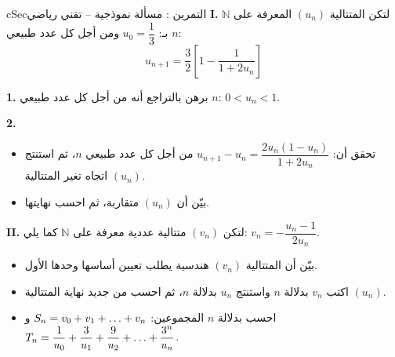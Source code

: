 \documentclass[12pt,a4paper]{article}
\newenvironment{BOX}[2]{\begin{otherlanguage}{english}\begin{arbox}{#1}{#2}}{\end{arbox}\end{otherlanguage}}
\newcounter{exo}
\newenvironment{tamrin}[1]{\stepcounter{exo}\begin{BOX}{cSec}{التمرين \theexo: #1}}{\end{BOX}}
\renewcommand{\dots}{\mathinner{\ldotp\ldotp\ldotp}}
\newcommand{\N}{\mathbb{N}}
\newenvironment{sq}{\begin{itemize}[leftmargin=2.4em,itemsep=3pt]}{\end{itemize}}
\newcommand{\qa}{\item[(أ)]}\newcommand{\qb}{\item[(ب)]}\newcommand{\qc}{\item[(جـ)]}\newcommand{\qd}{\item[(د)]}\newcommand{\qe}{\item[(هـ)]}
\newcommand{\QQ}[1]{\par\smallskip\textbf{#1.} }
\begin{document}
\begin{tamrin}{مسألة نموذجية -- تقني رياضي}
\textbf{I.} لتكن المتتالية $(u_n)$ المعرفة على $\N$ بـ: $u_0=\dfrac13$ ومن أجل كل عدد طبيعي $n$:
\[u_{n+1}=\frac32\left[1-\frac{1}{1+2u_n}\right]\]
\QQ{1} برهن بالتراجع أنه من أجل كل عدد طبيعي $n$: $0<u_n<1$.

\QQ{2}
\begin{sq}
\qa تحقق أن: $u_{n+1}-u_n=\dfrac{2u_n(1-u_n)}{1+2u_n}$ من أجل كل عدد طبيعي $n$، ثم استنتج اتجاه تغير المتتالية $(u_n)$.
\qb بيّن أن $(u_n)$ متقاربة، ثم احسب نهايتها.
\end{sq}
\textbf{II.} لتكن $(v_n)$ متتالية عددية معرفة على $\N$ كما يلي: $v_n=-\dfrac{u_n-1}{2u_n}$.
\begin{sq}
\qa بيّن أن المتتالية $(v_n)$ هندسية يطلب تعيين أساسها وحدها الأول.
\qb اكتب $v_n$ بدلالة $n$ واستنتج $u_n$ بدلالة $n$، ثم احسب من جديد نهاية المتتالية $(u_n)$.
\qc احسب بدلالة $n$ المجموعين: $S_n=v_0+v_1+\dots+v_n$ و $T_n=\dfrac{1}{u_0}+\dfrac{3}{u_1}+\dfrac{9}{u_2}+\dots+\dfrac{3^n}{u_n}$.
\end{sq}
\end{tamrin}
\end{document}

